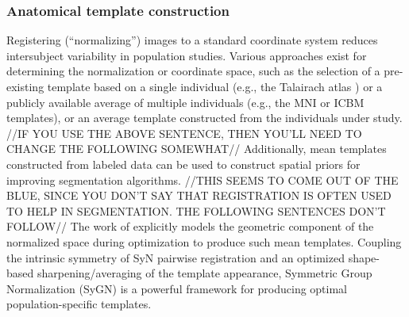\subsubsection{Anatomical template construction}

Registering (``normalizing'') images to a standard coordinate system
reduces intersubject variability in population studies.  Various
approaches exist for determining the normalization or coordinate space,
such as the selection of a pre-existing template based on a single individual
(e.g., the Talairach atlas \citep{Talairach1988}) or a publicly available average of multiple individuals
(e.g., the MNI \citep{Collins1994} or ICBM \citep{Mazziotta1995}
templates), or an average template constructed from the individuals under study.
//IF YOU USE THE ABOVE SENTENCE, THEN YOU'LL NEED TO CHANGE THE FOLLOWING SOMEWHAT//
Additionally, mean templates constructed from labeled
data can be used to construct spatial priors for improving segmentation
algorithms. //THIS SEEMS TO COME OUT OF THE BLUE,
SINCE YOU DON'T SAY THAT REGISTRATION IS OFTEN USED TO HELP IN SEGMENTATION.
THE FOLLOWING SENTENCES DON'T FOLLOW//
The work of \cite{avants2010} explicitly models the geometric component of the 
normalized space during optimization to produce such mean templates.  Coupling the intrinsic symmetry of 
SyN pairwise registration \citep{avants2011} and an
optimized shape-based sharpening/averaging of the template appearance, Symmetric Group
Normalization (SyGN) is a powerful framework for producing optimal population-specific
templates.

